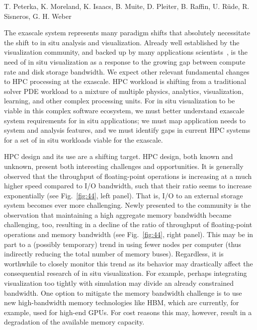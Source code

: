
\license

 T. Peterka, K. Moreland, K. Isaacs, B. Muite, D. Pleiter, B. Raffin, U.  Rüde, R. Sisneros, G. H. Weber

\begin{refsection}

The exascale system represents many paradigm shifts that absolutely necessitate the shift to in situ analysis and visualization. Already well established by the visualization community, and backed up by many applications scientists~\cite{Gerber18}, is the need of in situ visualization as a response to the growing gap between compute rate and disk storage bandwidth.
We expect other relevant fundamental changes to HPC processing at the exascale. HPC workload is shifting from a traditional solver PDE workload to a mixture of multiple physics, analytics, visualization, learning, and other complex processing units. For in situ visualization to be viable in this complex software ecosystem, we must better understand exascale system requirements for in situ applications; we must map application needs to system and analysis features, and we must identify gaps in current HPC systems for a set of in situ workloads viable for the exascale.

HPC design and its use are a shifting target. HPC design, both known and unknown, present both interesting challenges and opportunities.
It is generally observed that the throughput of floating-point operations is increasing at a much higher speed compared to I/O bandwidth, such that their ratio seems to increase exponentially (see Fig.~\ref{fig:44}, left panel). That is, I/O to an external storage system becomes ever more challenging. Newly presented to the community is the observation that maintaining a high aggregate memory bandwidth became challenging, too, resulting in a decline of the ratio of throughput of floating-point operations and memory bandwidth (see Fig.~\ref{fig:44}, right panel). This may be in part to a (possibly temporary) trend in using fewer nodes per computer (thus indirectly reducing the total number of memory buses). Regardless, it is worthwhile to closely monitor this trend as its behavior may drastically affect the consequential research of in situ visualization. For example, perhaps integrating visualization too tightly with simulation may divide an already constrained bandwidth. One option to mitigate the memory bandwidth challenge is to use new high-bandwidth memory technologies like HBM, which are currently, for example, used for high-end GPUs. For cost reasons this may, however, result in a degradation of the available memory capacity.


\end{refsection}

